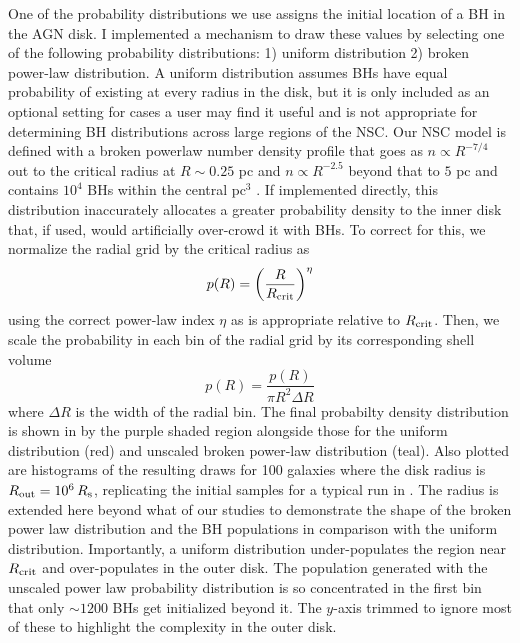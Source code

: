 One of the probability distributions we use assigns the initial location of a BH in the AGN disk.
I implemented a mechanism to draw these values by selecting one of the following probability distributions: 1) uniform distribution 2) broken power-law distribution.
A uniform distribution assumes BHs have equal probability of existing at every radius in the disk, but it is only included as an optional setting for cases a user may find it useful and is not appropriate for determining BH distributions across large regions of the NSC.
Our NSC model is defined with a broken powerlaw number density profile that goes as $n\propto R^{-7/4}$ out to the critical radius at $R\sim 0.25$ pc and $n\propto R^{-2.5}$ beyond that to $5$ pc and contains $10^4$ BHs within the central $\text{pc}^3$ \citep{Generozov+18}.
If implemented directly, this distribution inaccurately allocates a greater probability density to the inner disk that, if used, would artificially over-crowd it with BHs.
To correct for this, we normalize the radial grid by the critical radius as
\begin{equation}
	p(R) = \left( \frac{R}{R_{\rm crit}} \right)^\eta
\end{equation}
using the correct power-law index $\eta$ as is appropriate relative to $R_{\rm crit}$.
Then, we scale the probability in each bin of the radial grid by its corresponding shell volume
\begin{equation}
	p(R) = \frac{p(R)}{\pi R^2 \Delta R}
\end{equation}
where $\Delta R$ is the width of the radial bin.
The final probabilty density distribution is shown in  by the purple shaded region alongside those for the uniform distribution (red) and unscaled broken power-law distribution (teal).
Also plotted are histograms of the resulting draws for 100 galaxies where the disk radius is $R_{\rm out}=10^6\,R_{\rm s}$, replicating the initial samples for a typical run in \mcfacts.
The radius is extended here beyond what of our studies to demonstrate the shape of the broken power law distribution and the BH populations in comparison with the uniform distribution.
Importantly, a uniform distribution under-populates the region near $R_{\rm crit}$ and over-populates in the outer disk.
The population generated with the unscaled power law probability distribution is so concentrated in the first bin that only $\sim1200$ BHs get initialized beyond it.
The $y$-axis trimmed to ignore most of these to highlight the complexity in the outer disk.




